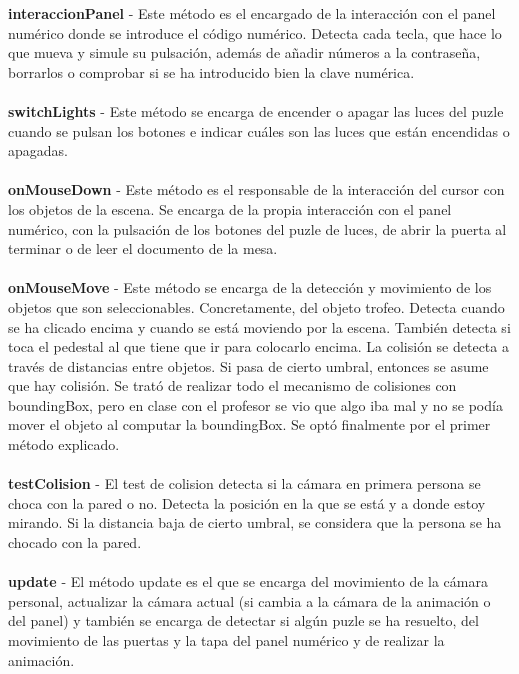 \textbf{interaccionPanel} - 
Este método es el encargado de la interacción con el panel numérico donde se introduce el código numérico. Detecta cada tecla, que hace lo que mueva y simule su pulsación, además de añadir números a la contraseña, borrarlos o comprobar si se ha introducido bien la clave numérica.\\\\
\textbf{switchLights} - 
Este método se encarga de encender o apagar las luces del puzle cuando se pulsan los botones e indicar cuáles son las luces que están encendidas o apagadas.\\\\
\textbf{onMouseDown} - 
Este método es el responsable de la interacción del cursor con los objetos de la escena. Se encarga de la propia interacción con el panel numérico, con la pulsación de los botones del puzle de luces, de abrir la puerta al terminar o de leer el documento de la mesa.\\\\
\textbf{onMouseMove} - 
Este método se encarga de la detección y movimiento de los objetos que son seleccionables. Concretamente, del objeto trofeo. Detecta cuando se ha clicado encima y cuando se está moviendo por la escena. También detecta si toca el pedestal al que tiene que ir para colocarlo encima. La colisión se detecta a través de distancias entre objetos. Si pasa de cierto umbral, entonces se asume que hay colisión. Se trató de realizar todo el mecanismo de colisiones con boundingBox, pero en clase con el profesor se vio que algo iba mal y no se podía mover el objeto al computar la boundingBox. Se optó finalmente por el primer método explicado.\\\\
\textbf{testColision} - 
El test de colision detecta si la cámara en primera persona se choca con la pared o no. Detecta la posición en la que se está y a donde estoy mirando. Si la distancia baja de cierto umbral, se considera que la persona se ha chocado con la pared.\\\\
\textbf{update} - 
El método update es el que se encarga del movimiento de la cámara personal, actualizar la cámara actual (si cambia a la cámara de la animación o del panel) y también se encarga de detectar si algún puzle se ha resuelto, del movimiento de las puertas y la tapa del panel numérico y de realizar la animación.\\\\

\newpage

